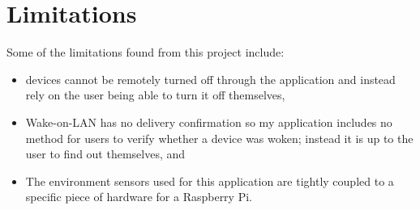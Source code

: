 
\section{Limitations}

Some of the limitations found from this project include:

\begin{itemize}[noitemsep]
    \item devices cannot be remotely turned off through the application and instead rely on the user being able to turn it off themselves,
    \item Wake-on-LAN has no delivery confirmation so my application includes no method for users to verify whether a device was woken; instead it is up to the user to find out themselves, and
    \item The environment sensors used for this application are tightly coupled to a specific piece of hardware for a Raspberry Pi.
\end{itemize}

